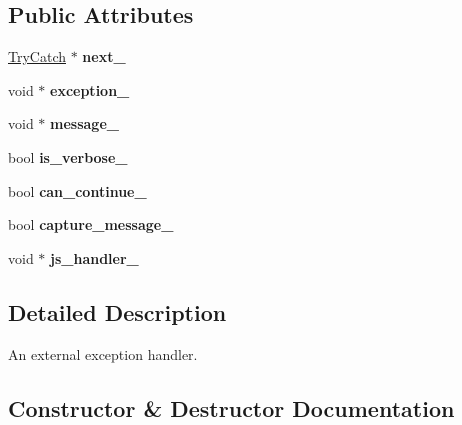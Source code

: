\subsection*{Public Attributes}
\begin{DoxyCompactItemize}
\item 
\hypertarget{classv8_1_1_try_catch_ae1e039966ea18612bb2ecfdd2602ea84}{}\hyperlink{classv8_1_1_try_catch}{Try\+Catch} $\ast$ {\bfseries next\+\_\+}\label{classv8_1_1_try_catch_ae1e039966ea18612bb2ecfdd2602ea84}

\item 
\hypertarget{classv8_1_1_try_catch_a4ae6a166af0336716516addc1f64fe1f}{}void $\ast$ {\bfseries exception\+\_\+}\label{classv8_1_1_try_catch_a4ae6a166af0336716516addc1f64fe1f}

\item 
\hypertarget{classv8_1_1_try_catch_a9317fc63672d0c1497cc88277b7ebd44}{}void $\ast$ {\bfseries message\+\_\+}\label{classv8_1_1_try_catch_a9317fc63672d0c1497cc88277b7ebd44}

\item 
\hypertarget{classv8_1_1_try_catch_a3c2798d8716a14df4550bfadefdcf6a7}{}bool {\bfseries is\+\_\+verbose\+\_\+}\label{classv8_1_1_try_catch_a3c2798d8716a14df4550bfadefdcf6a7}

\item 
\hypertarget{classv8_1_1_try_catch_a92c1bd92eecbc728d6c2150c338fef7d}{}bool {\bfseries can\+\_\+continue\+\_\+}\label{classv8_1_1_try_catch_a92c1bd92eecbc728d6c2150c338fef7d}

\item 
\hypertarget{classv8_1_1_try_catch_ad1f5b0368678fa2bd0d73ac17acf976e}{}bool {\bfseries capture\+\_\+message\+\_\+}\label{classv8_1_1_try_catch_ad1f5b0368678fa2bd0d73ac17acf976e}

\item 
\hypertarget{classv8_1_1_try_catch_aa13245997ead01d269399df308697543}{}void $\ast$ {\bfseries js\+\_\+handler\+\_\+}\label{classv8_1_1_try_catch_aa13245997ead01d269399df308697543}

\end{DoxyCompactItemize}


\subsection{Detailed Description}
An external exception handler. 

\subsection{Constructor \& Destructor Documentation}
\hypertarget{classv8_1_1_try_catch_adc9b1b11e73b0325df727914c348053d}{}
